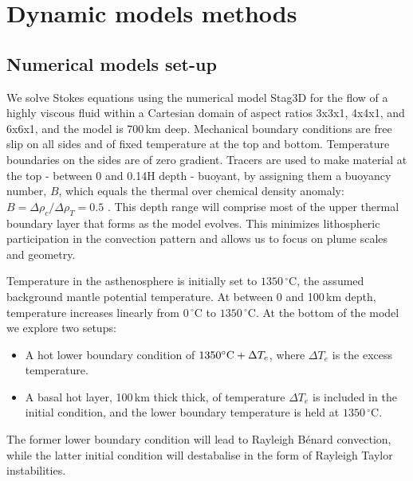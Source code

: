 \documentclass[a4paper,10pt,twocolumn]{paper}
\begin{document}
\section{Dynamic models methods}

\subsection{Numerical models set-up}

We solve Stokes equations using the numerical model Stag3D \citep{tackley-1998} for the flow of a highly viscous fluid within a Cartesian domain of aspect ratios 3x3x1, 4x4x1, and 6x6x1, and the model is 700\,km deep. Mechanical boundary conditions are free slip on all sides and of fixed temperature at the top and bottom. Temperature boundaries on the sides are of zero gradient. Tracers are used to make material at the top - between 0 and 0.14H depth - buoyant, by assigning them a buoyancy number, $B$, which equals the thermal over chemical density anomaly: $B = \Delta\rho_{c}/\Delta\rho_{T} = 0.5$ \citep{fourel-2009}. This depth range will comprise most of the upper thermal boundary layer that forms as the model evolves. This minimizes lithospheric participation in the convection pattern and allows us to focus on plume scales and geometry.

Temperature in the asthenosphere is initially set to $1350\,^{\circ}$C, the assumed background mantle potential temperature. At between 0 and 100\,km depth, temperature increases linearly from $0\,^{\circ}$C  to $1350\,^{\circ}$C. At the bottom of the model we explore two setups:
\begin{itemize}
\item A hot lower boundary condition of $1350{\rm^{\circ} C} + \Delta T_{e}$, where $\Delta T_{e}$ is the excess temperature.
\item A basal hot layer, 100\,km thick thick, of temperature $\Delta T_{e}$ is included in the initial condition, and the lower boundary temperature is held at $1350\,^{\circ}$C.
\end{itemize}
The former lower boundary condition will lead to Rayleigh B{\'e}nard convection, while the latter initial condition will destabalise in the form of Rayleigh Taylor instabilities.
\end{document}
